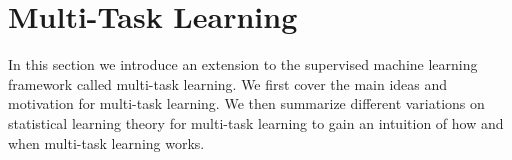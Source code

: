 \chapter{Multi-Task Learning}
\label{multi-task_learning}
In this section we introduce an extension to the supervised machine learning framework called multi-task learning. We first cover the main ideas and motivation for multi-task learning. We then summarize different variations on statistical learning theory for multi-task learning to gain an intuition of how and when multi-task learning works.




